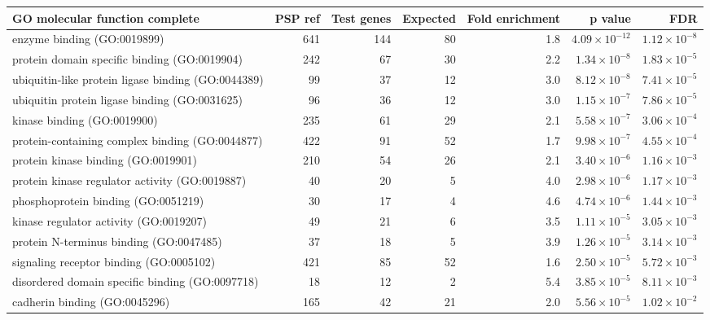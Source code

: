 \begin{table}[ht]
\centering
\begin{adjustbox}{width=\textwidth}

\begin{tabular}{lrrrrrr}
  \hline
GO molecular function complete & PSP ref & Test genes & Expected & Fold enrichment & p value & FDR \\ 
  \hline
enzyme binding (GO:0019899) & 641 & 144 & 80 & 1.8 & $4.09 \times 10^{-12}$ & $1.12 \times 10^{-8}$ \\ 
  protein domain specific binding (GO:0019904) & 242 & 67 & 30 & 2.2 & $1.34 \times 10^{-8}$ & $1.83 \times 10^{-5}$ \\ 
  ubiquitin-like protein ligase binding (GO:0044389) & 99 & 37 & 12 & 3.0 & $8.12 \times 10^{-8}$ & $7.41 \times 10^{-5}$ \\ 
  ubiquitin protein ligase binding (GO:0031625) & 96 & 36 & 12 & 3.0 & $1.15 \times 10^{-7}$ & $7.86 \times 10^{-5}$ \\ 
  kinase binding (GO:0019900) & 235 & 61 & 29 & 2.1 & $5.58 \times 10^{-7}$ & $3.06 \times 10^{-4}$ \\ 
  protein-containing complex binding (GO:0044877) & 422 & 91 & 52 & 1.7 & $9.98 \times 10^{-7}$ & $4.55 \times 10^{-4}$ \\ 
  protein kinase binding (GO:0019901) & 210 & 54 & 26 & 2.1 & $3.40 \times 10^{-6}$ & $1.16 \times 10^{-3}$ \\ 
  protein kinase regulator activity (GO:0019887) & 40 & 20 & 5 & 4.0 & $2.98 \times 10^{-6}$ & $1.17 \times 10^{-3}$ \\ 
  phosphoprotein binding (GO:0051219) & 30 & 17 & 4 & 4.6 & $4.74 \times 10^{-6}$ & $1.44 \times 10^{-3}$ \\ 
  kinase regulator activity (GO:0019207) & 49 & 21 & 6 & 3.5 & $1.11 \times 10^{-5}$ & $3.05 \times 10^{-3}$ \\ 
  protein N-terminus binding (GO:0047485) & 37 & 18 & 5 & 3.9 & $1.26 \times 10^{-5}$ & $3.14 \times 10^{-3}$ \\ 
  signaling receptor binding (GO:0005102) & 421 & 85 & 52 & 1.6 & $2.50 \times 10^{-5}$ & $5.72 \times 10^{-3}$ \\ 
  disordered domain specific binding (GO:0097718) & 18 & 12 & 2 & 5.4 & $3.85 \times 10^{-5}$ & $8.11 \times 10^{-3}$ \\ 
  cadherin binding (GO:0045296) & 165 & 42 & 21 & 2.0 & $5.56 \times 10^{-5}$ & $1.02 \times 10^{-2}$ \\ 

\end{tabular}
\end{adjustbox}
\end{table}
